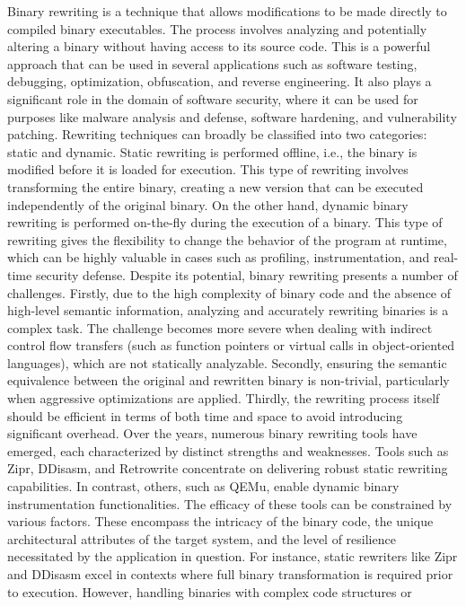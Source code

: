 \documentclass[a4paper,11pt,oneside]{report}
\begin{document}
Binary rewriting is a technique that allows modifications to be made directly to
compiled binary executables. The process involves analyzing and potentially altering a
binary without having access to its source code. This is a powerful approach that can be
used in several applications such as software testing, debugging, optimization, obfuscation,
and reverse engineering. It also plays a significant role in the domain of software security,
where it can be used for purposes like malware analysis and defense, software hardening,
and vulnerability patching.
Rewriting techniques can broadly be classified into two categories: static and
dynamic. Static rewriting is performed offline, i.e., the binary is modified before it is loaded
for execution. This type of rewriting involves transforming the entire binary, creating a new
version that can be executed independently of the original binary. On the other hand,
dynamic binary rewriting is performed on-the-fly during the execution of a binary. This type
of rewriting gives the flexibility to change the behavior of the program at runtime, which can
be highly valuable in cases such as profiling, instrumentation, and real-time security
defense.
Despite its potential, binary rewriting presents a number of challenges. Firstly, due
to the high complexity of binary code and the absence of high-level semantic information,
analyzing and accurately rewriting binaries is a complex task. The challenge becomes more
severe when dealing with indirect control flow transfers (such as function pointers or virtual
calls in object-oriented languages), which are not statically analyzable. Secondly, ensuring
the semantic equivalence between the original and rewritten binary is non-trivial,
particularly when aggressive optimizations are applied. Thirdly, the rewriting process itself
should be efficient in terms of both time and space to avoid introducing significant
overhead.
Over the years, numerous binary rewriting tools have emerged, each characterized
by distinct strengths and weaknesses. Tools such as Zipr, DDisasm, and Retrowrite
concentrate on delivering robust static rewriting capabilities. In contrast, others, such as
QEMu, enable dynamic binary instrumentation functionalities.
The efficacy of these tools can be constrained by various factors. These encompass
the intricacy of the binary code, the unique architectural attributes of the target system,
and the level of resilience necessitated by the application in question. For instance, static
rewriters like Zipr and DDisasm excel in contexts where full binary transformation is
required prior to execution. However, handling binaries with complex code structures or
\end{document}
